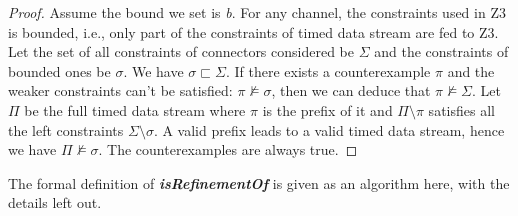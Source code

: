 \documentclass[3p,times]{elsarticle}
\begin{document}
\begin{proof}
Assume the bound we set is \emph{b}. For any channel, the constraints used in Z3 is bounded, i.e., only part of the constraints of timed data stream are fed to Z3. Let the set of all constraints of connectors considered be $\Sigma$ and the constraints of bounded ones be $\sigma$. We have $\sigma \sqsubset \Sigma$. If there exists a counterexample $\pi$ and the weaker constraints can't be satisfied: $\pi \nvDash \sigma$, then we can deduce that $\pi \nvDash \Sigma$. Let $\Pi$ be the full timed data stream where $\pi$ is the prefix of it and $\Pi \setminus \pi$ satisfies all the left constraints $\Sigma \setminus \sigma$.
A valid prefix leads to a valid timed data stream, hence we have $\Pi \nvDash \sigma$.
The counterexamples are always true.
\end{proof}
The formal definition of \textbf{\emph{isRefinementOf}} is given as an algorithm here, with the details left out.
\end{document}
